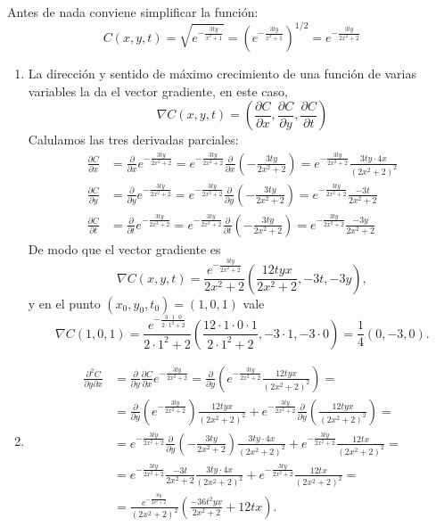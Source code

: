 {Antes de nada conviene simplificar la función:
\[
C(x,y,t) = \sqrt{e^{-\frac{3ty}{x^2+1}}} = \left(e^{-\frac{3ty}{x^2+1}}\right)^{1/2} = e^{-\frac{3ty}{2x^2+2}}
\]
\begin{enumerate}
\item La dirección y sentido de máximo crecimiento de una función de varias variables la da el vector gradiente, en este caso,
\[
\nabla C(x,y,t) =\left(\frac{\partial C}{\partial x}, \frac{\partial C}{\partial y}, \frac{\partial C}{\partial t} \right)
\]
Calulamos las tres derivadas parciales:
\begin{align*}
\frac{\partial C}{\partial x} &= \frac{\partial}{\partial x} e^{-\frac{3ty}{2x^2+2}} = e^{-\frac{3ty}{2x^2+2}} \frac{\partial}{\partial x}\left(-\frac{3ty}{2x^2+2}\right) = e^{-\frac{3ty}{2x^2+2}}\frac{3ty\cdot 4x}{(2x^2+2)^2} \\
\frac{\partial C}{\partial y} &= \frac{\partial}{\partial y} e^{-\frac{3ty}{2x^2+2}} = e^{-\frac{3ty}{2x^2+2}} \frac{\partial}{\partial y}\left(-\frac{3ty}{2x^2+2}\right) = e^{-\frac{3ty}{2x^2+2}}\frac{-3t}{2x^2+2} \\
\frac{\partial C}{\partial t} &= \frac{\partial}{\partial t} e^{-\frac{3ty}{2x^2+2}} = e^{-\frac{3ty}{2x^2+2}} \frac{\partial}{\partial t}\left(-\frac{3ty}{2x^2+2}\right) = e^{-\frac{3ty}{2x^2+2}}\frac{-3y}{2x^2+2}
\end{align*}
De modo que el vector gradiente es
\[
\nabla C(x,y,t) =\frac{e^{-\frac{3ty}{2x^2+2}}}{2x^2+2}\left(\frac{12tyx}{2x^2+2}, -3t, -3y\right),
\]
y en el punto $(x_0,y_0,t_0)=(1,0,1)$ vale
\[
\nabla C(1,0,1) =\frac{e^{-\frac{3\cdot 1\cdot 0}{2\cdot 1^2+2}}}{2\cdot 1^2+2}\left(\frac{12\cdot 1\cdot 0\cdot 1}{2\cdot 1^2+2}, -3\cdot 1, -3\cdot 0\right) = \frac{1}{4}(0,-3,0).
\]

\item
\begin{align*}
\frac{\partial^2 C}{\partial y\partial x} &= \frac{\partial}{\partial y}\frac{\partial C}{\partial x} e^{-\frac{3ty}{2x^2+2}} = \frac{\partial}{\partial y}  \left(e^{-\frac{3ty}{2x^2+2}}\frac{12tyx}{(2x^2+2)^2}\right) = \\
&= \frac{\partial}{\partial y} \left(e^{-\frac{3ty}{2x^2+2}}\right)\frac{12tyx}{(2x^2+2)^2}+e^{-\frac{3ty}{2x^2+2}}\frac{\partial}{\partial y}\left(\frac{12tyx}{(2x^2+2)^2}\right) = \\
&= e^{-\frac{3ty}{2x^2+2}}\frac{\partial}{\partial y}\left(-\frac{3ty}{2x^2+2}\right)\frac{3ty\cdot 4x}{(2x^2+2)^2}+e^{-\frac{3ty}{2x^2+2}}\frac{12tx}{(2x^2+2)^2} = \\
&= e^{-\frac{3ty}{2x^2+2}}\frac{-3t}{2x^2+2}\frac{3ty\cdot 4x}{(2x^2+2)^2}+e^{-\frac{3ty}{2x^2+2}}\frac{12tx}{(2x^2+2)^2} = \\
&= \frac{e^{-\frac{3ty}{2x^2+2}}}{(2x^2+2)^2}\left(\frac{-36t^2yx}{2x^2+2}+12tx\right).
\end{align*}


\end{enumerate}}
